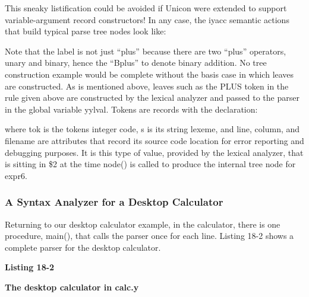 
This sneaky listification could be avoided if Unicon were extended to
support variable-argument record constructors! In any case, the iyacc
semantic actions that build typical parse tree nodes look like:


Note that the label is not just
{\textquotedblleft}plus{\textquotedblright} because there are two
{\textquotedblleft}plus{\textquotedblright} operators, unary and
binary, hence the {\textquotedblleft}Bplus{\textquotedblright} to
denote binary addition. No tree construction example would be complete
without the basis case in which leaves are constructed. As is mentioned
above, leaves such as the \textsf{PLUS} token in the rule given above
are constructed by the lexical analyzer and passed to the parser in the
global variable \textsf{yylval}. Tokens are records with the
declaration:


\noindent
where \textsf{tok} is the token{\textquotesingle}s integer code,
\textsf{s} is its string lexeme, and \textsf{line}, \textsf{column},
and \textsf{filename} are attributes that record its source code
location for error reporting and debugging purposes. It is this type of
value, provided by the lexical analyzer, that is sitting in
\textsf{\$2} at the time \textsf{node()} is called to produce the
internal tree node for \textsf{expr6}.

\subsubsection{A Syntax Analyzer for a Desktop Calculator}

Returning to our desktop calculator example, in the calculator, there is
one procedure, \textsf{main()}, that calls the parser once for each
line. Listing 18-2 shows a complete parser for the desktop calculator.

\bigskip

{\sffamily\bfseries
Listing 18-2}

{\sffamily\bfseries
The desktop calculator in calc.y}


